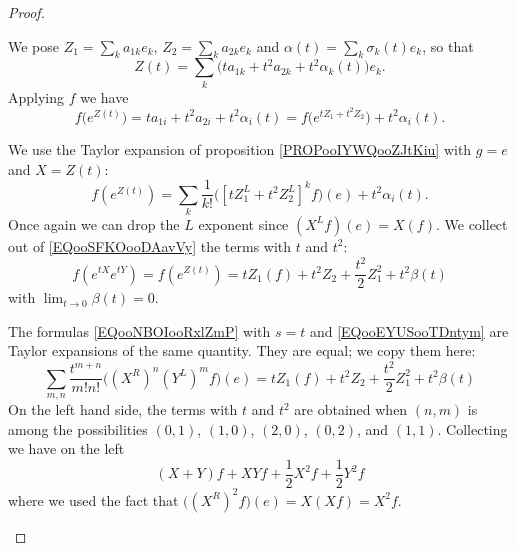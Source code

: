 \begin{proof}
\begin{subproof}

            We pose \( Z_1=\sum_ka_{1k}e_k\), \( Z_2=\sum_ka_{2k}e_k\) and \( \alpha(t)=\sum_k\sigma_k(t)e_k\), so that
            \begin{equation}
                Z(t)=\sum_k\big( ta_{1k}+t^2a_{2k}+t^2\alpha_k(t) \big)e_k.
            \end{equation}
            Applying \( f\) we have
            \begin{equation}
                f\big(  e^{Z(t)} \big)=ta_{1i}+t^2a_{2i}+t^2\alpha_i(t)=f\big(  e^{tZ_1+t^2Z_2} \big)+t^2\alpha_i(t).
            \end{equation}
            

            We use the Taylor expansion of proposition \ref{PROPooIYWQooZJtKiu} with \( g=e\) and \( X=Z(t)\):
            \begin{equation}        \label{EQooSFKOooDAavVy}
                f( e^{Z(t)})=\sum_k\frac{1}{ k! }\big( [tZ^L_1+t^2Z_2^L]^kf \big)(e)+t^2\alpha_i(t).
            \end{equation}
            Once again we can drop the \( L\) exponent since \( (X^Lf)(e)=X(f)\). We collect out of \eqref{EQooSFKOooDAavVy} the terms with \( t\) and \( t^2\):
            \begin{equation}        \label{EQooEYUSooTDntym}
                f( e^{tX} e^{tY})=f( e^{Z(t)})=tZ_1(f)+t^2 Z_2 +\frac{ t^2 }{2}Z_1^2 +t^2\beta(t)
            \end{equation}
            with \( \lim_{t\to 0} \beta(t)=0\).

        \spitem[Comparison]

            The formulas \eqref{EQooNBOIooRxlZmP} with \( s=t\) and \eqref{EQooEYUSooTDntym} are Taylor expansions of the same quantity. They are equal; we copy them here:
            \begin{equation}
                \sum_{m,n}\frac{ t^{m+n} }{ m!n! }\big( (X^R)^n(Y^L)^mf \big)(e)=tZ_1(f)+t^2 Z_2 +\frac{ t^2 }{2}Z_1^2 +t^2\beta(t)
            \end{equation}
            On the left hand side, the terms with \( t\) and \( t^2\) are obtained when \( (n,m)\) is among the possibilities $(0,1)$, $(1,0)$, $(2,0)$, $(0,2)$, and $(1,1)$. Collecting we have on the left
            \begin{equation}
                (X+Y)f+XYf+\frac{ 1 }{2}X^2f+\frac{ 1 }{2}Y^2f
            \end{equation}
            where we used the fact that \( \big( (X^R)^2f \big)(e)=X(Xf)=X^2f\).


\end{subproof}
\end{proof}
